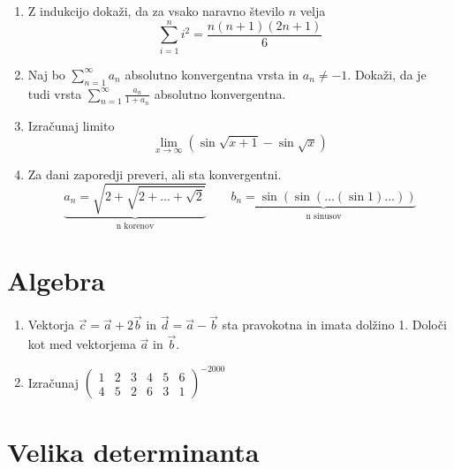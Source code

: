 \documentclass[a4paper,12pt]{article}
\begin{document}
\begin{enumerate}
\item
Z indukcijo dokaži, da za vsako naravno število \(n\) velja
\[
    \sum_{i=1}^{n}i^2 = \frac{n(n+1)(2n+1)}{6}
\]

\item
Naj bo $\sum_{n=1}^\infty a_n$ absolutno konvergentna vrsta in \(a_n \ne -1\).
Dokaži, da je tudi vrsta \(\sum_{n=1}^\infty \frac{a_n}{1+a_n}\)
absolutno konvergentna.

\item
Izračunaj limito
\[
    \lim_{x \to \infty} (\sin \sqrt{x+1} - \sin \sqrt{x})
\]

\item
Za dani zaporedji preveri, ali sta konvergentni.
\[
    \underbrace{a_n = \sqrt{2+\sqrt{2+\dots+\sqrt{2}}}}_{\text{n~korenov}} \qquad
    \underbrace{b_n = \sin(\sin(\dots(\sin 1)\dots))}_{\text{n~sinusov}}
\]
\end{enumerate}

\section*{Algebra}

\begin{enumerate}
\item
Vektorja $\vec{c} = \vec{a} + 2\vec{b}$ in $\vec{d} = \vec{a} - \vec{b}$
sta pravokotna in imata dolžino 1. Določi kot med vektorjema \(\vec{a}\) in \(\vec{b}\).

\item
Izračunaj
$\begin{pmatrix}
    1 & 2 & 3 & 4 & 5 & 6 \\
    4 & 5 & 2 & 6 & 3 & 1
\end{pmatrix}
^{-2000}$

\end{enumerate}

\section*{Velika determinanta}
\end{document}
